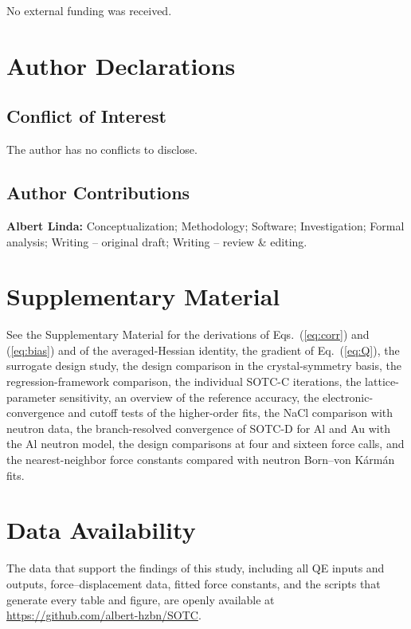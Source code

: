 \documentclass[aip,jap,reprint,amsmath,amssymb,floatfix]{revtex4-2}
\begin{document}
\begin{acknowledgments}
No external funding was received.
\end{acknowledgments}

\section*{Author Declarations}
\subsection*{Conflict of Interest}
The author has no conflicts to disclose.
\subsection*{Author Contributions}
\textbf{Albert Linda:} Conceptualization; Methodology; Software; Investigation;
Formal analysis; Writing -- original draft; Writing -- review \& editing.

\section*{Supplementary Material}
See the Supplementary Material for the derivations of Eqs.~(\ref{eq:corr})
and (\ref{eq:bias}) and of the averaged-Hessian identity, the gradient of
Eq.~(\ref{eq:Q}), the surrogate design study, the design comparison in the
crystal-symmetry basis, the regression-framework comparison, the
individual SOTC-C iterations, the lattice-parameter sensitivity, an
overview of the reference accuracy, the electronic-convergence and cutoff
tests of the higher-order fits, the NaCl comparison with neutron data, the
branch-resolved convergence of SOTC-D for Al and Au with the Al neutron
model, the design comparisons at four and sixteen force calls, and the
nearest-neighbor force constants compared with neutron Born--von K\'arm\'an
fits.

\section*{Data Availability}
The data that support the findings of this study, including all QE inputs and
outputs, force--displacement data, fitted force constants, and the
scripts that generate every table and figure, are openly available at
\url{https://github.com/albert-hzbn/SOTC}.


\end{document}
